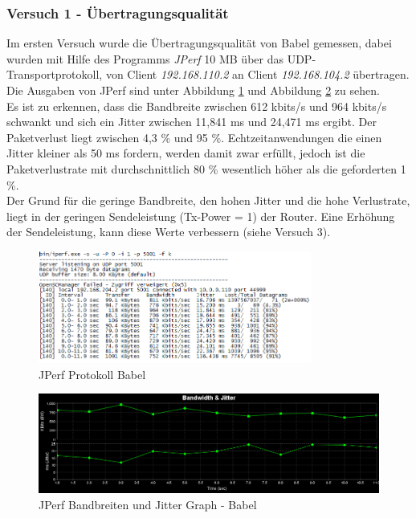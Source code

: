 \documentclass[10pt]{scrartcl}
\begin{document}
\subsubsection{Versuch 1 - Übertragungsqualität}
Im ersten Versuch wurde die Übertragungsqualität von Babel gemessen, dabei wurden mit Hilfe des Programms \textit{JPerf} 10 MB über das UDP-Transportprotokoll, von Client \textit{192.168.110.2} an Client \textit{192.168.104.2} übertragen.\\
Die Ausgaben von JPerf sind unter Abbildung \ref{fig:JPerf_Babel_Protokoll} und Abbildung \ref{fig:JPerf_Babel_Graph} zu sehen.\\
Es ist zu erkennen, dass die Bandbreite zwischen 612 kbits/s und 964 kbits/s schwankt und sich ein Jitter zwischen 11,841 ms und 24,471 ms ergibt. Der Paketverlust liegt zwischen 4,3 \% und  95 \%. Echtzeitanwendungen die einen Jitter kleiner als 50 ms fordern, werden damit zwar erfüllt, jedoch ist die Paketverlustrate mit durchschnittlich 80 \% wesentlich höher als die geforderten 1 \%.\\
Der Grund für die geringe Bandbreite, den hohen Jitter und die hohe Verlustrate, liegt in der geringen Sendeleistung (Tx-Power = 1) der Router. Eine Erhöhung der Sendeleistung, kann diese Werte verbessern (siehe Versuch 3).

\begin{figure}[htbp]
	\centering	\includegraphics[width=0.8\textwidth]{Grafiken/Babel_TX1_Protokoll.png}
	\caption{JPerf Protokoll Babel}
	\label{fig:JPerf_Babel_Protokoll}
\end{figure}

\begin{figure}[htbp]
	\centering	\includegraphics[width=1.0\textwidth]{Grafiken/Babel_TX1_Grafik.png}
	\caption{JPerf Bandbreiten und Jitter Graph - Babel}
	\label{fig:JPerf_Babel_Graph}
\end{figure}
\end{document}
